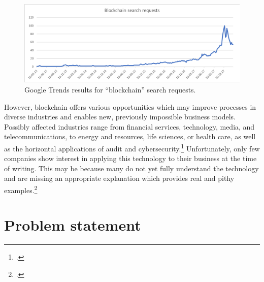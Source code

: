 \begin{figure}
    \centering
    \includegraphics[width=\textwidth]{latex-vorlage_v1.5/graphics/BCRQ.png}
    \caption[Google Trends results for \enquote{blockchain} search requests.]{Google Trends results for \enquote{blockchain} search requests.\protect\footnotemark}
    \label{fig:SearchRequests}
\end{figure}

However, blockchain offers various opportunities which may improve processes in diverse industries and enables new, previously impossible business models. Possibly affected industries range from financial services, technology, media, and telecommunications, to energy and resources, life sciences, or health care, as well as the horizontal applications of audit and cybersecurity.\footcite[Cf.][]{SchatskybitcoinBlockchaincoming2015} Unfortunately, only few companies show interest in applying this technology to their business at the time of writing. This may be because many do not yet fully understand the technology and are missing an appropriate explanation which provides real and pithy examples.\footcite[Cf.][P88]{BjoernPaulewicz_Interview}



\section{Problem statement} \label{sec:Problem}

